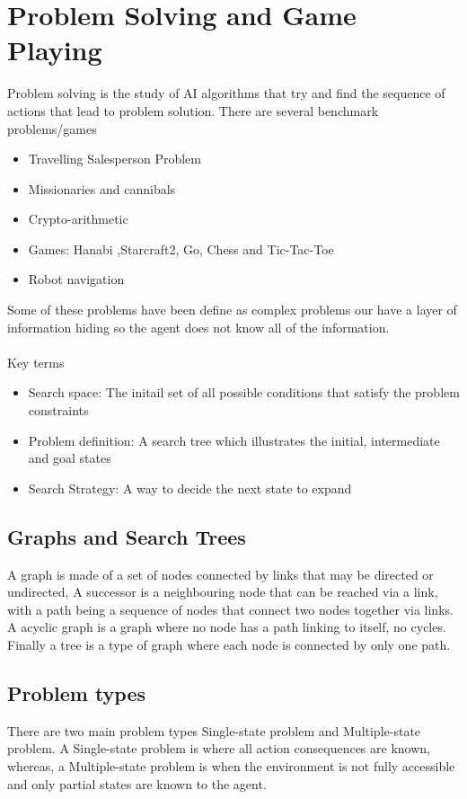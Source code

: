 \section{Problem Solving and Game Playing}
Problem solving is the study of AI algorithms that try and find the sequence of actions that lead to problem solution. There are several benchmark problems/games 
\begin{itemize}
    \item Travelling Salesperson Problem
    \item Missionaries and cannibals
    \item Crypto-arithmetic
    \item Games: Hanabi ,Starcraft2, Go, Chess and Tic-Tac-Toe
    \item Robot navigation
\end{itemize}
Some of these problems have been define as complex problems our have a layer of information hiding so the agent does not know all of the information.
\\\\
Key terms
\begin{itemize}
    \item Search space: The initail set of all possible conditions that satisfy the problem constraints
    \item Problem definition: A search tree which illustrates the initial, intermediate and goal states
    \item Search Strategy: A way to decide the next state to expand
\end{itemize}
\subsection{Graphs and Search Trees}
A graph is made of a set of nodes connected by links that may be directed or undirected, A successor is a neighbouring node that can be reached via a link, with a path being a sequence of nodes that connect two nodes together via links. A acyclic graph is a graph where no node has a path linking to itself, no cycles. Finally a tree is a type of graph where each node is connected by only one path. 
\subsection{Problem types}
There are two main problem types Single-state problem and Multiple-state problem. A Single-state problem is where all action consequences are known, whereas, a Multiple-state problem is when the environment is not fully accessible and only partial states are known to the agent.

